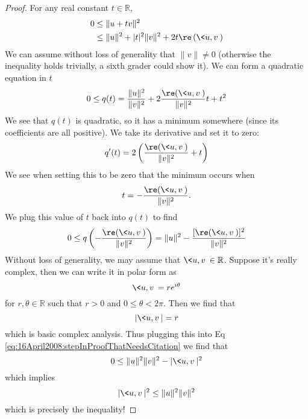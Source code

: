 \begin{proof}
For any real constant $t\in\mathbb{R}$,
\begin{subequations}
\begin{align}
0&\leq\|u+tv\|^2 \\
&\leq\|u\|^2+|t|^2\|v\|^2 + 2t\re\left(\<u,v\>\right)
\end{align}
\end{subequations}
We can assume without loss of generality that $\|v\|\neq0$
(otherwise the inequality holds trivially, a sixth grader
could show it). We can form a quadratic equation in $t$
\begin{equation}
0 \leq q(t) = \frac{\|u\|^2}{\|v\|^2} +
2\frac{\re(\<u,v\>)}{\|v\|^2}t + t^2
\end{equation}
We see that $q(t)$ is quadratic, so it has a minimum
somewhere (since its coefficients are all positive). We take
its derivative and set it to zero:
\begin{equation}
q'(t) = 2\left(\frac{\re(\<u,v\>)}{\|v\|^2} + t\right)
\end{equation}
We see when setting this to be zero that the minimum occurs when
\begin{equation}
t = -\frac{\re(\<u,v\>)}{\|v\|^2}.
\end{equation}
We plug this value of $t$ back into $q(t)$ to find
\begin{equation}\label{eq:16April2008:stepInProofThatNeedsCitation}
0\leq q\left( -\frac{\re(\<u,v\>)}{\|v\|^2}\right) = \|u\|^2 - \frac{[\re(\<u,v\>)]^2}{\|v\|^2}
\end{equation}
Without loss of generality, we may assume that
$\<u,v\>\in\mathbb{R}$. Suppose it's really complex, then we
can write it in polar form as
\begin{equation}
\<u,v\> = re^{i\theta}
\end{equation}
for $r,\theta\in\mathbb{R}$ such that $r>0$ and
$0\leq\theta<2\pi$. Then we find that
\begin{equation}
|\<u,v\>|=r
\end{equation}
which is basic complex analysis. Thus plugging this into Eq
\eqref{eq:16April2008:stepInProofThatNeedsCitation} we find
that
\begin{equation}
0\leq \|u\|^2\|v\|^2 - |\<u,v\>|^2
\end{equation}
which implies
\begin{equation}
|\<u,v\>|^2\leq\|u\|^2\|v\|^2
\end{equation}
which is precisely the inequality!
\end{proof}

